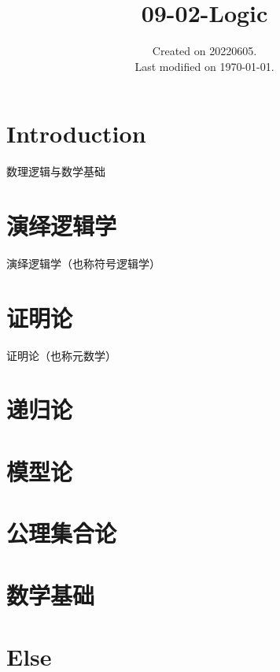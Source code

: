 \documentclass[UTF8]{../09-Mathematics}
\begin{document}
\title{09-02-Logic}
\date{Created on 20220605.\\   Last modified on \today.}
\maketitle
\tableofcontents


\chapter{Introduction}

数理逻辑与数学基础





\chapter{演绎逻辑学}
演绎逻辑学（也称符号逻辑学）

\chapter{证明论}
证明论（也称元数学）

\chapter{递归论}
\chapter{模型论}

\chapter{公理集合论}



\chapter{数学基础}
\chapter{Else}
\end{document}

